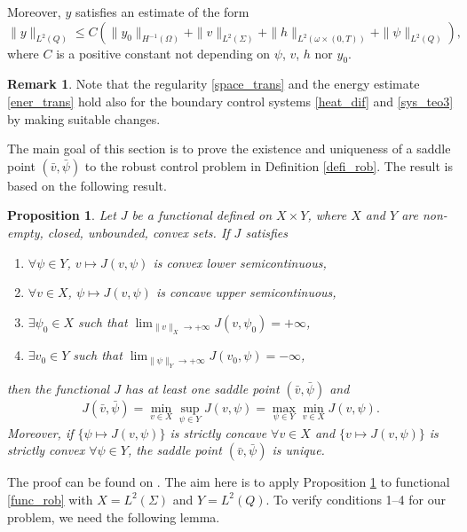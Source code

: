 \documentclass{dcds-bOF}
\newtheorem{proposition}{Proposition}
\theoremstyle{definition}
\newtheorem{remark}{Remark}
\begin{document}
Moreover, $y$ satisfies an estimate of the form
%
\begin{equation}\label{ener_trans}
\|y\|_{L^2(Q)}\leq C\left(\|y_0\|_{H^{-1}(\Omega)}+\|v\|_{L^2(\Sigma)}+\|h\|_{L^2(\omega\times(0,T))}+\|\psi\|_{L^2(Q)}\right),
\end{equation}
%
where $C$ is a positive constant not depending on $\psi$, $v$, $h$ nor $y_0$.

\begin{remark}
Note that the regularity \eqref{space_trans} and the energy estimate \eqref{ener_trans} hold also for the boundary control systems \eqref{heat_dif} and \eqref{sys_teo3} by making suitable changes.
\end{remark}

The main goal of this section is to prove the existence and uniqueness of a saddle point $(\bar v,\bar\psi)$ to the robust control problem in Definition \ref{defi_rob}. The result is based on the following result.
%
\begin{proposition}\label{prop_saddle}
Let $J$ be a functional defined on $X\times Y$, where $X$ and $Y$ are non-empty, closed, unbounded, convex sets. If $J$ satisfies
%
\begin{enumerate}
\item $\forall \psi\in Y$, $v\mapsto J(v,\psi)$ is convex lower semicontinuous,
\item $\forall v\in X$, $\psi\mapsto J(v,\psi)$ is concave upper semicontinuous,
\item $\exists \psi_0\in X$ such that $\lim_{\|v\|_{X}\to+\infty}J(v,\psi_0)=+\infty$,
\item $\exists v_0\in Y$ such that $\lim_{\|\psi\|_Y\to+\infty}J(v_0,\psi)=-\infty$,
\end{enumerate}
%
then the functional $J$ has at least one saddle point $(\bar v,\bar \psi)$ and
%
\begin{equation*}
J(\bar v,\bar \psi)=\min_{v\in X}\sup_{\psi\in Y} J(v,\psi)=\max_{\psi\in Y}\min_{v\in X}J(v,\psi).
\end{equation*}
%
Moreover, if $\{\psi\mapsto J(v,\psi)\}$ is strictly concave $\forall v\in X$ and $\{v\mapsto J(v,\psi)\}$ is strictly convex $\forall \psi\in Y$, the saddle point $(\bar v,\bar \psi)$ is unique.
\end{proposition}

 The proof can be found on \cite[Prop. 1.5 and 2.2, Ch. VI]{Ekeland}. The aim here is to apply Proposition \ref{prop_saddle} to functional \eqref{func_rob} with $X=L^2(\Sigma)$ and $Y=L^2(Q)$. To verify conditions 1--4 for our problem, we need the following lemma.
\end{document}
